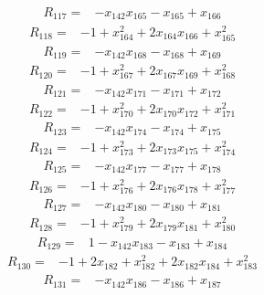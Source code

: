 \begin{align*}
R_{117}={}& -x_{142}x_{165} - x_{165} + x_{166}
\end{align*}
\begin{align*}
R_{118}={}& -1 + x_{164}^{2} + 2x_{164}x_{166} + x_{165}^{2}
\end{align*}
\begin{align*}
R_{119}={}& -x_{142}x_{168} - x_{168} + x_{169}
\end{align*}
\begin{align*}
R_{120}={}& -1 + x_{167}^{2} + 2x_{167}x_{169} + x_{168}^{2}
\end{align*}
\begin{align*}
R_{121}={}& -x_{142}x_{171} - x_{171} + x_{172}
\end{align*}
\begin{align*}
R_{122}={}& -1 + x_{170}^{2} + 2x_{170}x_{172} + x_{171}^{2}
\end{align*}
\begin{align*}
R_{123}={}& -x_{142}x_{174} - x_{174} + x_{175}
\end{align*}
\begin{align*}
R_{124}={}& -1 + x_{173}^{2} + 2x_{173}x_{175} + x_{174}^{2}
\end{align*}
\begin{align*}
R_{125}={}& -x_{142}x_{177} - x_{177} + x_{178}
\end{align*}
\begin{align*}
R_{126}={}& -1 + x_{176}^{2} + 2x_{176}x_{178} + x_{177}^{2}
\end{align*}
\begin{align*}
R_{127}={}& -x_{142}x_{180} - x_{180} + x_{181}
\end{align*}
\begin{align*}
R_{128}={}& -1 + x_{179}^{2} + 2x_{179}x_{181} + x_{180}^{2}
\end{align*}
\begin{align*}
R_{129}={}& 1 - x_{142}x_{183} - x_{183} + x_{184}
\end{align*}
\begin{align*}
R_{130}={}& -1 + 2x_{182} + x_{182}^{2} + 2x_{182}x_{184} + x_{183}^{2}
\end{align*}
\begin{align*}
R_{131}={}& -x_{142}x_{186} - x_{186} + x_{187}
\end{align*}
